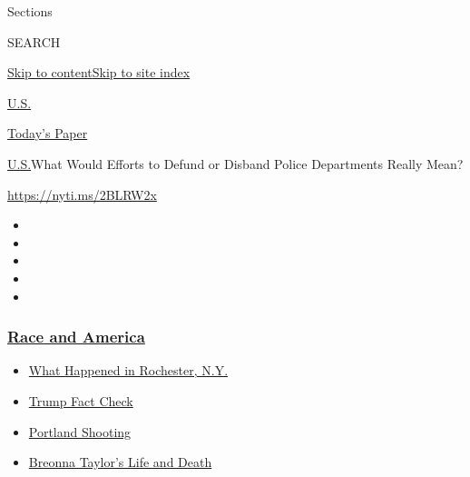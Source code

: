 Sections

SEARCH

\protect\hyperlink{site-content}{Skip to
content}\protect\hyperlink{site-index}{Skip to site index}

\href{https://www.nytimes3xbfgragh.onion/section/us}{U.S.}

\href{https://myaccount.nytimes3xbfgragh.onion/auth/login?response_type=cookie\&client_id=vi}{}

\href{https://www.nytimes3xbfgragh.onion/section/todayspaper}{Today's
Paper}

\href{/section/us}{U.S.}\textbar{}What Would Efforts to Defund or
Disband Police Departments Really Mean?

\url{https://nyti.ms/2BLRW2x}

\begin{itemize}
\item
\item
\item
\item
\item
\end{itemize}

\hypertarget{race-and-america}{%
\subsubsection{\texorpdfstring{\href{https://www.nytimes3xbfgragh.onion/news-event/george-floyd-protests-minneapolis-new-york-los-angeles?name=styln-george-floyd\&region=TOP_BANNER\&block=storyline_menu_recirc\&action=click\&pgtype=Article\&impression_id=11e0a990-f290-11ea-81e4-6de745fcf3cc\&variant=undefined}{Race
and America}}{Race and America}}\label{race-and-america}}

\begin{itemize}
\tightlist
\item
  \href{https://www.nytimes3xbfgragh.onion/2020/09/04/nyregion/rochester-police-daniel-prude.html?name=styln-george-floyd\&region=TOP_BANNER\&block=storyline_menu_recirc\&action=click\&pgtype=Article\&impression_id=11e0a991-f290-11ea-81e4-6de745fcf3cc\&variant=undefined}{What
  Happened in Rochester, N.Y.}
\item
  \href{https://www.nytimes3xbfgragh.onion/2020/09/01/us/politics/trump-fact-check-protests.html?name=styln-george-floyd\&region=TOP_BANNER\&block=storyline_menu_recirc\&action=click\&pgtype=Article\&impression_id=11e0a992-f290-11ea-81e4-6de745fcf3cc\&variant=undefined}{Trump
  Fact Check}
\item
  \href{https://www.nytimes3xbfgragh.onion/2020/08/30/us/portland-shooting-explained.html?name=styln-george-floyd\&region=TOP_BANNER\&block=storyline_menu_recirc\&action=click\&pgtype=Article\&impression_id=11e0a993-f290-11ea-81e4-6de745fcf3cc\&variant=undefined}{Portland
  Shooting}
\item
  \href{https://www.nytimes3xbfgragh.onion/2020/08/30/us/breonna-taylor-police-killing.html?name=styln-george-floyd\&region=TOP_BANNER\&block=storyline_menu_recirc\&action=click\&pgtype=Article\&impression_id=11e0a994-f290-11ea-81e4-6de745fcf3cc\&variant=undefined}{Breonna
  Taylor's Life and Death}
\end{itemize}

